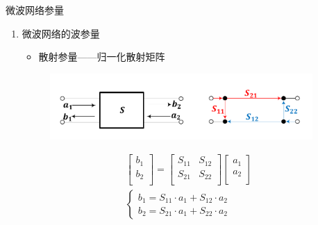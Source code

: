 \begin{frame}{微波网络参量}
    \begin{enumerate}
        \resume
        \item 微波网络的波参量\\
              \begin{itemize}
                  \item 散射参量——归一化散射矩阵
              \end{itemize}
              \begin{figure}
                  \includegraphics[width=10cm]{Cha5//fig5-11.pdf}
              \end{figure}
              \begin{gather*}
                  \begin{bmatrix*}
                      b_1 \\
                      b_2 \\
                  \end{bmatrix*}=
                  \begin{bmatrix*}
                      S_{11} & S_{12} \\
                      S_{21} & S_{22} \\
                  \end{bmatrix*}
                  \begin{bmatrix*}
                      a_1 \\
                      a_2 \\
                  \end{bmatrix*}\\
                  \begin{cases}
                      b_1=S_{11}\cdot a_1+S_{12}\cdot a_2 \\
                      b_2=S_{21}\cdot a_1+S_{22}\cdot a_2
                  \end{cases}
              \end{gather*}
    \end{enumerate}
\end{frame}

